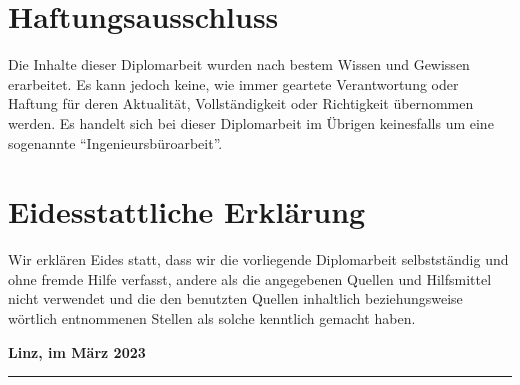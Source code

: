 \newcommand\signature[1]{%
\begin{center}
\begin{minipage}{10cm}
    \centering
    \vspace{3cm}\par
    \noindent
    \hspace{1.25cm}\rule{10cm}{0.5pt}\par
    \noindent
    \hspace{2.5cm}\textbf{#1}
\end{minipage}
\end{center}}


\section{Haftungsausschluss}
Die Inhalte dieser Diplomarbeit wurden nach bestem Wissen und Gewissen erarbeitet. Es kann jedoch keine, wie immer geartete Verantwortung oder Haftung für deren Aktualität, Vollständigkeit oder Richtigkeit übernommen werden. Es handelt sich bei dieser Diplomarbeit im Übrigen keinesfalls um eine sogenannte ``Ingenieursbüroarbeit''.

\newpage

\section{Eidesstattliche Erklärung}
Wir erklären Eides statt, dass wir die vorliegende Diplomarbeit selbstständig und ohne fremde Hilfe verfasst, andere als die angegebenen Quellen und Hilfsmittel nicht verwendet und die den benutzten Quellen inhaltlich beziehungsweise wörtlich entnommenen Stellen als solche kenntlich gemacht haben.

\vspace{1.5cm}
\noindent
\textbf{Linz, im März 2023}

\signature{\titlePageFullNameGp}

